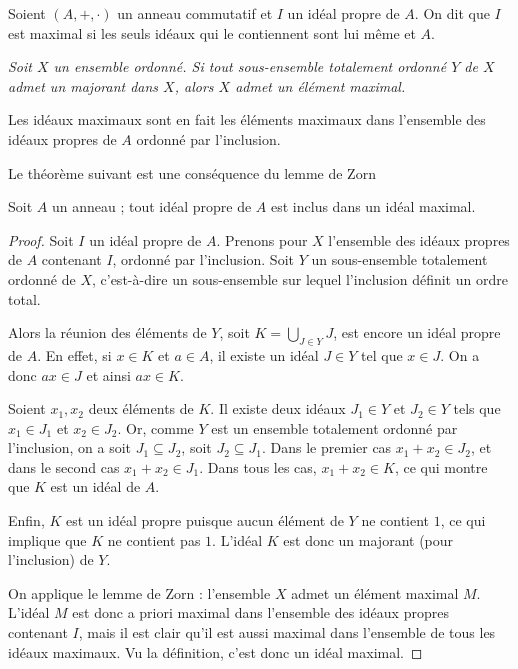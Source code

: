     \begin{definition}
        Soient $(A,+,\cdot)$ un anneau commutatif et $I$ un idéal propre de $A$. On dit que $I$ est maximal si les seuls idéaux qui le contiennent sont lui même et $A$.
    \end{definition}

\begin{theoreme}
    \textit{Soit $X$ un ensemble ordonné. Si tout sous-ensemble totalement ordonné $Y$ de $X$ admet un majorant dans $X$, alors $X$ admet un élément maximal.}

Les idéaux maximaux sont en fait les éléments maximaux dans l’ensemble des idéaux propres de $A$ ordonné par l’inclusion.
\end{theoreme}

Le théorème suivant est une conséquence du lemme de Zorn

\begin{theoreme}
    Soit $A$ un anneau ; tout idéal propre de $A$ est inclus dans un idéal maximal.
\end{theoreme}

\begin{proof}
    Soit $I$ un idéal propre de $A$. Prenons pour $X$ l’ensemble des idéaux propres de $A$ contenant $I$, ordonné par l’inclusion. Soit $Y$ un sous-ensemble totalement ordonné de $X$, c’est-à-dire un sous-ensemble sur lequel l’inclusion définit un ordre total.

    Alors la réunion des éléments de $Y$, soit $K = \bigcup_{J \in Y} J$, est encore un idéal propre de $A$. En effet, si $x \in K$ et $a \in A$, il existe un idéal $J \in Y$ tel que $x \in J$. On a donc $ax \in J$ et ainsi $ax \in K$. 
    
    Soient $x_1, x_2$ deux éléments de $K$. Il existe deux idéaux $J_1 \in Y$ et $J_2 \in Y$ tels que $x_1 \in J_1$ et $x_2 \in J_2$. Or, comme $Y$ est un ensemble totalement ordonné par l’inclusion, on a soit $J_1 \subseteq J_2$, soit $J_2 \subseteq J_1$. Dans le premier cas $x_1 + x_2 \in J_2$, et dans le second cas $x_1 + x_2 \in J_1$. Dans tous les cas, $x_1 + x_2 \in K$, ce qui montre que $K$ est un idéal de $A$.
    
    Enfin, $K$ est un idéal propre puisque aucun élément de $Y$ ne contient $1$, ce qui implique que $K$ ne contient pas $1$. L’idéal $K$ est donc un majorant (pour l’inclusion) de $Y$.
    
    On applique le lemme de Zorn : l’ensemble $X$ admet un élément maximal $M$. L’idéal $M$ est donc a priori maximal dans l’ensemble des idéaux propres contenant $I$, mais il est clair qu’il est aussi maximal dans l’ensemble de tous les idéaux maximaux. Vu la définition, c’est donc un idéal maximal.
\end{proof}

